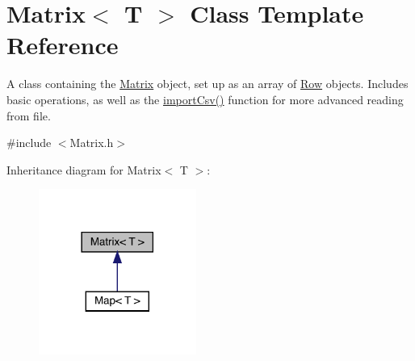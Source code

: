 \hypertarget{class_matrix}{}\section{Matrix$<$ T $>$ Class Template Reference}
\label{class_matrix}


A class containing the \hyperlink{class_matrix}{Matrix} object, set up as an array of \hyperlink{class_row}{Row} objects. Includes basic operations, as well as the \hyperlink{class_matrix_a0a5d9135e9807b81ddc3cf05e777a902}{import\+Csv()} function for more advanced reading from file.  




{\ttfamily \#include $<$Matrix.\+h$>$}



Inheritance diagram for Matrix$<$ T $>$\+:\nopagebreak
\begin{figure}[H]
\begin{center}
\leavevmode
\includegraphics[width=146pt]{class_matrix__inherit__graph}
\end{center}
\end{figure}
